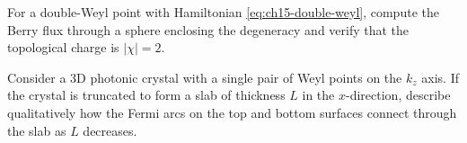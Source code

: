\begin{exercise}
  For a double-Weyl point with Hamiltonian \eqref{eq:ch15-double-weyl},
  compute the Berry flux through a sphere enclosing the degeneracy and
  verify that the topological charge is $|\chi|=2$.
\end{exercise}

\begin{exercise}
  Consider a 3D photonic crystal with a single pair of Weyl points on
  the $k_z$ axis.  If the crystal is truncated to form a slab of
  thickness $L$ in the $x$-direction, describe qualitatively how the
  Fermi arcs on the top and bottom surfaces connect through the slab
  as $L$ decreases.
\end{exercise}
